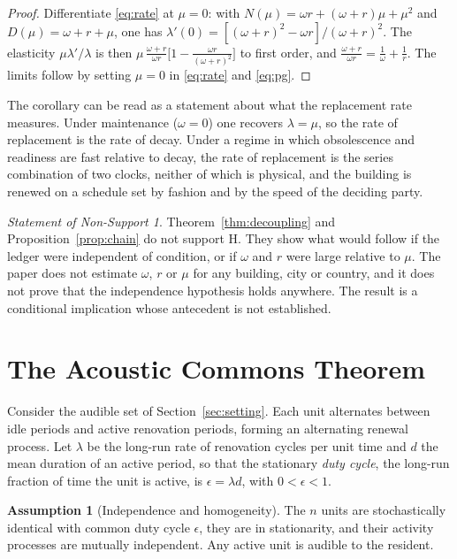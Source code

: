 \documentclass[11pt]{article}
\theoremstyle{definition}
\newtheorem{assumption}[theorem]{Assumption}
\theoremstyle{remark}
\newtheorem{nonsupport}{Statement of Non-Support}
\begin{document}
\begin{proof}
Differentiate \eqref{eq:rate} at $\mu=0$: with $N(\mu)=\omega r+(\omega+r)\mu+\mu^2$ and $D(\mu)=\omega+r+\mu$, one has $\lambda'(0) = [(\omega+r)^2-\omega r]/(\omega+r)^2$. The elasticity $\mu\lambda'/\lambda$ is then $\mu\,\frac{\omega+r}{\omega r}\bigl[1-\frac{\omega r}{(\omega+r)^2}\bigr]$ to first order, and $\frac{\omega+r}{\omega r} = \frac1\omega+\frac1r$. The limits follow by setting $\mu=0$ in \eqref{eq:rate} and \eqref{eq:pg}.
\end{proof}

The corollary can be read as a statement about what the replacement rate measures. Under maintenance ($\omega=0$) one recovers $\lambda=\mu$, so the rate of replacement is the rate of decay. Under a regime in which obsolescence and readiness are fast relative to decay, the rate of replacement is the series combination of two clocks, neither of which is physical, and the building is renewed on a schedule set by fashion and by the speed of the deciding party.

\begin{nonsupport}\label{ns:adequacy}
Theorem~\ref{thm:decoupling} and Proposition~\ref{prop:chain} do not support H. They show what would follow if the ledger were independent of condition, or if $\omega$ and $r$ were large relative to $\mu$. The paper does not estimate $\omega$, $r$ or $\mu$ for any building, city or country, and it does not prove that the independence hypothesis holds anywhere. The result is a conditional implication whose antecedent is not established.
\end{nonsupport}

\section{The Acoustic Commons Theorem}\label{sec:commons}

Consider the audible set of Section~\ref{sec:setting}. Each unit alternates between idle periods and active renovation periods, forming an alternating renewal process. Let $\lambda$ be the long-run rate of renovation cycles per unit time and $d$ the mean duration of an active period, so that the stationary \emph{duty cycle}, the long-run fraction of time the unit is active, is $\epsilon = \lambda d$, with $0<\epsilon<1$.

\begin{assumption}[Independence and homogeneity]\label{as:indep}
The $n$ units are stochastically identical with common duty cycle $\epsilon$, they are in stationarity, and their activity processes are mutually independent. Any active unit is audible to the resident.
\end{assumption}
\end{document}
